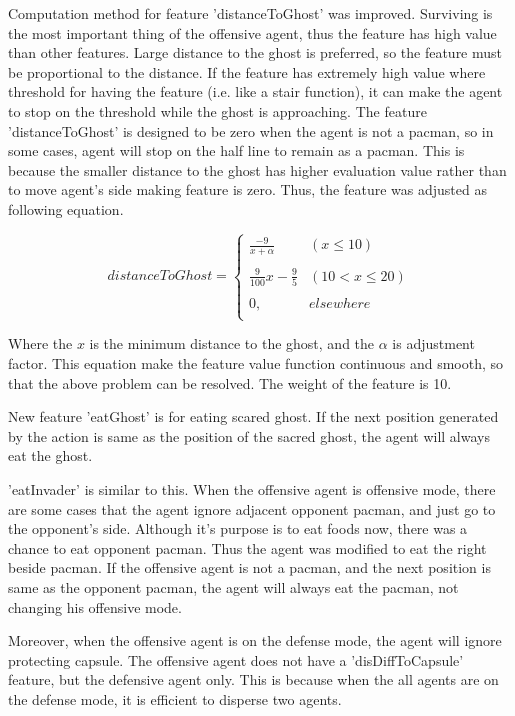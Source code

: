 \documentclass{article}
\theoremstyle{plain}
\theoremstyle{definition}
\theoremstyle{remark}
\begin{document}
Computation method for feature 'distanceToGhost' was improved. Surviving is the most important thing of the offensive agent, thus the feature has high value than other features. Large distance to the ghost is preferred, so the feature must be proportional to the distance. If the feature has extremely high value where threshold for having the feature (i.e. like a stair function), it can make the agent to stop on the threshold while the ghost is approaching. The feature 'distanceToGhost' is designed to be zero when the agent is not a pacman, so in some cases, agent will stop on the half line to remain as a pacman. This is because the smaller distance to the ghost has higher evaluation value rather than to move agent's side making feature is zero. Thus, the feature was adjusted as following equation.

\begin{equation}
    distanceToGhost =
    \left\{\begin{matrix}
\frac{-9}{x + \alpha} & (x \leq 10) \\
& \\
\frac{9}{100}x - \frac{9}{5} & (10 < x \leq 20) \\
& \\
0, & elsewhere \\
\end{matrix}\right.
\end{equation}



Where the $x$ is the minimum distance to the ghost, and the $\alpha$ is adjustment factor. This equation make the feature value function continuous and smooth, so that the above problem can be resolved. The weight of the feature is 10.

New feature 'eatGhost' is for eating scared ghost. If the next position generated by the action is same as the position of the sacred ghost, the agent will always eat the ghost. 

'eatInvader' is similar to this. When the offensive agent is offensive mode, there are some cases that the agent ignore adjacent opponent pacman, and just go to the opponent's side. Although it's purpose is to eat foods now, there was a chance to eat opponent pacman. Thus the agent was modified to eat the right beside pacman. If the offensive agent is not a pacman, and the next position is same as the opponent pacman, the agent will always eat the pacman, not changing his offensive mode.

Moreover, when the offensive agent is on the defense mode, the agent will ignore protecting capsule. The offensive agent does not have a 'disDiffToCapsule' feature, but the defensive agent only. This is because when the all agents are on the defense mode, it is efficient to disperse two agents.
\end{document}
